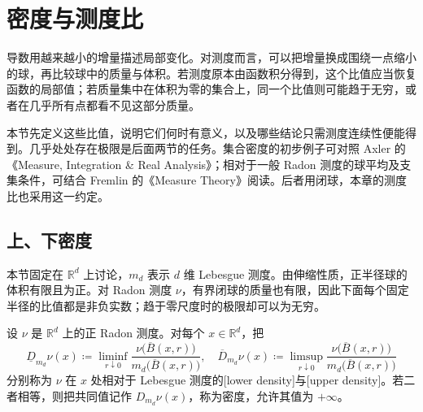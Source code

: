 \section{密度与测度比}
\label{b1:sec:1401}

导数用越来越小的增量描述局部变化。对测度而言，可以把增量换成围绕一点缩小的球，再比较球中的质量与体积。若测度原本由函数积分得到，这个比值应当恢复函数的局部值；若质量集中在体积为零的集合上，同一个比值则可能趋于无穷，或者在几乎所有点都看不见这部分质量。

\ProseParagraphBreak

本节先定义这些比值，说明它们何时有意义，以及哪些结论只需测度连续性便能得到。几乎处处存在极限是后面两节的任务。集合密度的初步例子可对照 Axler 的《Measure, Integration \& Real Analysis》\cite[4.22 Definition density, 4.23 Example density of an interval, and 4.24 Lebesgue Density Theorem]{Axler2020Measure}；相对于一般 Radon 测度的球平均及支集条件，可结合 Fremlin 的《Measure Theory》\cite[472D--E]{Fremlin2016Measure}阅读。后者用闭球，本章的测度比也采用这一约定。

\subsection{上、下密度}
\label{b1:subsec:140101}

本节固定在 \(\mathbb R^d\) 上讨论，\(m_d\) 表示 \(d\) 维 Lebesgue 测度。由伸缩性质，正半径球的体积有限且为正。对 Radon 测度 \(\nu\)，有界闭球的质量也有限，因此下面每个固定半径的比值都是非负实数；趋于零尺度时的极限却可以为无穷。

\begin{definition}
\label{b1:def:measure-densities}
设 \(\nu\) 是 \(\mathbb R^d\) 上的正 Radon 测度。对每个 \(x\in\mathbb R^d\)，把
\[
\underline D_{m_d}\nu(x)
\coloneqq\liminf_{r\downarrow0}
\frac{\nu\bigl(\overline B(x,r)\bigr)}{m_d\bigl(\overline B(x,r)\bigr)},
\quad
\overline D_{m_d}\nu(x)
\coloneqq\limsup_{r\downarrow0}
\frac{\nu\bigl(\overline B(x,r)\bigr)}{m_d\bigl(\overline B(x,r)\bigr)}
\]
分别称为 \(\nu\) 在 \(x\) 处相对于 Lebesgue 测度的[lower density]与[upper density]。若二者相等，则把共同值记作 \(D_{m_d}\nu(x)\)，称为密度，允许其值为 \(+\infty\)。
\end{definition}

